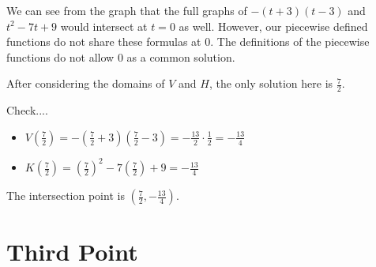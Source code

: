 \documentclass{ximera}
\begin{document}
We can see from the graph that the full graphs of $-(t+3)(t-3)$ and $t^2 - 7 t + 9$ would intersect at $t = 0$ as well.  However, our piecewise defined functions do not share these formulas at $0$.  The definitions of the piecewise functions do not allow $0$ as a common solution.

After considering the domains of $V$ and $H$, the only solution here is $\frac{7}{2}$.






Check....
\begin{itemize}
\item $V(\tfrac{7}{2}) = -\left(\tfrac{7}{2} + 3\right) \left(\tfrac{7}{2} - 3\right) = -\tfrac{13}{2}  \cdot \tfrac{1}{2} = -\frac{13}{4}$
\item $K(\tfrac{7}{2}) =   \left(\tfrac{7}{2}\right)^2 - 7\left(\tfrac{7}{2}\right) + 9 = -\frac{13}{4}$
\end{itemize}


The intersection point is $\left(\tfrac{7}{2}, -\frac{13}{4}\right)$.

















\section{Third Point}
\end{document}
